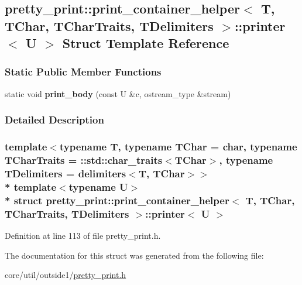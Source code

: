 \hypertarget{structpretty__print_1_1print__container__helper_1_1printer}{}\subsection{pretty\+\_\+print\+:\+:print\+\_\+container\+\_\+helper$<$ T, T\+Char, T\+Char\+Traits, T\+Delimiters $>$\+:\+:printer$<$ U $>$ Struct Template Reference}
\label{structpretty__print_1_1print__container__helper_1_1printer}
\subsubsection*{Static Public Member Functions}
\begin{DoxyCompactItemize}
\item 
static void {\bfseries print\+\_\+body} (const U \&c, ostream\+\_\+type \&stream)\hypertarget{structpretty__print_1_1print__container__helper_1_1printer_a136a8260b98e4c22a94dc1d86d9b2c11}{}\label{structpretty__print_1_1print__container__helper_1_1printer_a136a8260b98e4c22a94dc1d86d9b2c11}

\end{DoxyCompactItemize}


\subsubsection{Detailed Description}
\subsubsection*{template$<$typename T, typename T\+Char = char, typename T\+Char\+Traits = \+::std\+::char\+\_\+traits$<$\+T\+Char$>$, typename T\+Delimiters = delimiters$<$\+T, T\+Char$>$$>$\\*
template$<$typename U$>$\\*
struct pretty\+\_\+print\+::print\+\_\+container\+\_\+helper$<$ T, T\+Char, T\+Char\+Traits, T\+Delimiters $>$\+::printer$<$ U $>$}



Definition at line 113 of file pretty\+\_\+print.\+h.



The documentation for this struct was generated from the following file\+:\begin{DoxyCompactItemize}
\item 
core/util/outside1/\hyperlink{pretty__print_8h}{pretty\+\_\+print.\+h}\end{DoxyCompactItemize}
